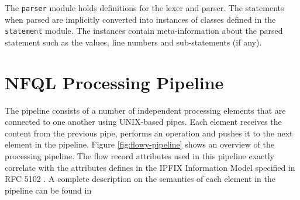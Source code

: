 The \texttt{parser} module holds definitions for the lexer and parser. The
statements when  parsed are implicitly
converted into instances of classes defined in the \texttt{statement} module.
The instances contain meta-information about the parsed statement such as the
values, line numbers and sub-statements (if any).



\section{NFQL Processing Pipeline}\label{sec:processing-pipeline}
The pipeline consists of a number of independent processing elements that are
connected to one another using UNIX-based pipes. Each element receives the
content from the previous pipe, performs an operation and pushes it to the
next element in the pipeline. Figure \ref{fig:flowy-pipeline} shows an
overview of the processing pipeline. The flow record attributes used in this
pipeline exactly correlate with the attributes defines in the \ac{IPFIX}
Information Model specified in RFC 5102 \cite{rfc5102}. A complete description
on the semantics of each element in the pipeline can be found in
\cite{vmarinov:thesis:2009}

